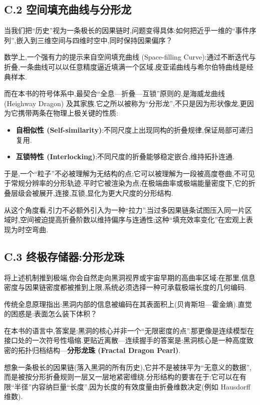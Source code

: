\subsection*{C.2 空间填充曲线与分形龙}

当我们把``历史''视为一条极长的因果链时,问题变得具体:如何把近乎一维的``事件序列'',嵌入到三维空间与四维时空中,同时保持因果偏序？

数学上,一个强有力的提示来自空间填充曲线 (Space-filling Curve):通过不断迭代与折叠,一条曲线可以以任意精度逼近填满一个区域.皮亚诺曲线与希尔伯特曲线是经典样本.

而在本书的符号体系中,最契合``全息---折叠---互锁''原则的,是海威龙曲线 (Heighway Dragon) 及其家族.它之所以被称为``分形龙'',不只是因为形状像龙,更因为它携带两条在物理上极关键的性质:

\begin{itemize}
\item \textbf{自相似性 (Self-similarity)}:不同尺度上出现同构的折叠规律,保证局部可递归复用.
\item \textbf{互锁特性 (Interlocking)}:不同尺度的折叠能够稳定嵌合,维持拓扑连通.
\end{itemize}

于是,一个``粒子''不必被理解为无结构的点;它可以被理解为一段被高度卷曲,不可见于常规分辨率的分形轨迹.平时它被渲染为点;在极端曲率或极端能量密度下,它的折叠层级会被展开,连接,互锁,显化为更大尺度的分形结构.

从这个角度看,引力不必额外引入为一种``拉力''.当过多因果链条试图压入同一片区域时,空间被迫提高折叠阶数以维持偏序与连通性;这种``填充效率变化''在宏观上表现为时空弯曲.

\subsection*{C.3 终极存储器:分形龙珠}

将上述机制推到极端,你会自然走向黑洞视界或宇宙早期的高曲率区域:在那里,信息密度与因果链密度都被推到上限,系统必须选择一种可承载极端长度的几何编码.

传统全息原理指出:黑洞内部的信息被编码在其表面积上(贝肯斯坦---霍金熵).直觉的困惑是:表面怎么装下体积？

在本书的语言中,答案是:黑洞的核心并非一个``无限密度的点''.那更像是连续模型在接口处的一次符号性塌缩.更贴近离散---连续握手的答案是:黑洞核心是一种高度致密的拓扑归档结构---\textbf{分形龙珠 (Fractal Dragon Pearl)}.

想象一条极长的因果链(落入黑洞的所有历史),它并不是被抹平为``无意义的数据'',而是被按分形折叠规则一层又一层地紧密缠绕.分形结构的要害在于:它可以在有限``半径''内容纳巨量``长度'',因为长度的有效度量由折叠维数决定(例如 Hausdorff 维数).

